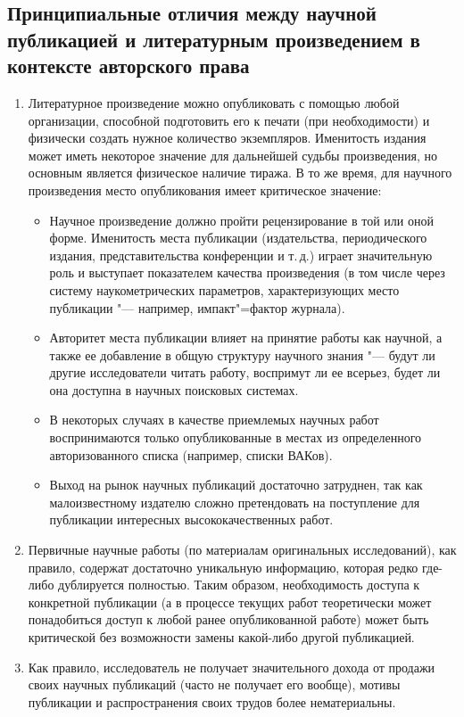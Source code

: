 \documentclass[10pt, a5paper]{article}
\begin{document}
\subsection*{Принципиальные отличия между научной публикацией и литературным произведением в контексте авторского права}
\begin{enumerate}
  \item Литературное произведение можно опубликовать с помощью любой организации, способной подготовить его к печати (при необходимости) и физически создать нужное количество экземпляров. Именитость издания может иметь некоторое значение для дальнейшей судьбы произведения, но основным является физическое наличие тиража. В то же время, для научного произведения место опубликования имеет критическое значение:\begin{itemize}
  \item Научное произведение должно пройти рецензирование в той или оной форме. Именитость места публикации (издательства, периодического издания, представительства конференции и т.\,д.) играет значительную роль и выступает показателем качества произведения (в том числе через систему наукометрических параметров, характеризующих место публикации "--- например, импакт"=фактор журнала).
  \item Авторитет места публикации влияет на принятие работы как научной, а также ее добавление в общую структуру научного знания "--- будут ли другие исследователи читать работу, воспримут ли ее всерьез, будет ли она доступна в научных поисковых системах.
  \item В некоторых случаях в качестве приемлемых научных работ воспринимаются только опубликованные в местах из определенного авторизованного списка (например, списки ВАКов).
  \item Выход на рынок научных публикаций достаточно затруднен, так как малоизвестному издателю сложно претендовать на поступление для публикации интересных высококачественных работ.
\end{itemize}


  \item Первичные научные работы (по материалам оригинальных исследований), как правило, содержат достаточно уникальную информацию, которая редко где-либо дублируется полностью. Таким образом, необходимость доступа к конкретной публикации (а в процессе текущих работ теоретически может понадобиться доступ к любой ранее опубликованной работе) может быть критической без возможности замены какой-либо другой публикацией.
  \item Как правило, исследователь не получает значительного дохода от продажи своих научных публикаций (часто не получает его вообще), мотивы публикации и распространения своих трудов более нематериальны.
\end{enumerate}
\end{document}
